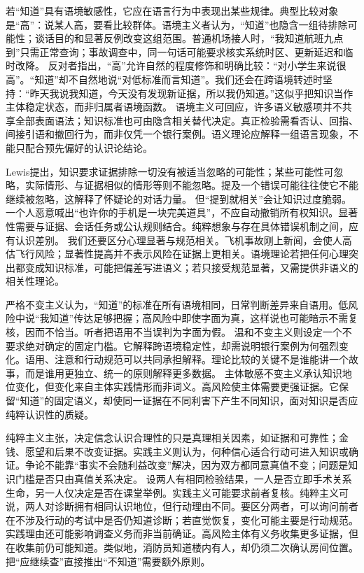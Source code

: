 若“知道”具有语境敏感性，它应在语言行为中表现出某些规律。典型比较对象是“高”：说某人高，要看比较群体。语境主义者认为，“知道”也隐含一组待排除可能性；谈话目的和显著反例改变这组范围\parencite{derose2009}。普通机场接人时，“我知道航班九点到”只需正常查询；事故调查中，同一句话可能要求核实系统时区、更新延迟和临时改降。 反对者指出，“高”允许自然的程度修饰和明确比较：“对小学生来说很高”。“知道”却不自然地说“对低标准而言知道”。我们还会在跨语境转述时坚持：“昨天我说我知道，今天没有发现新证据，所以我仍知道。”这似乎把知识当作主体稳定状态，而非归属者语境函数。 语境主义可回应，许多语义敏感项并不共享全部表面语法；知识标准也可由隐含相关替代决定。真正检验需看否认、回指、间接引语和撤回行为，而非仅凭一个银行案例。语义理论应解释一组语言现象，不能只配合预先偏好的认识论结论。

Lewis提出，知识要求证据排除一切没有被适当忽略的可能性；某些可能性可忽略，实际情形、与证据相似的情形等则不能忽略\parencite{lewis1996}。提及一个错误可能往往使它不能继续被忽略，这解释了怀疑论的对话力量。 但“提到就相关”会让知识过度脆弱。一个人恶意喊出“也许你的手机是一块完美道具”，不应自动撤销所有权知识。显著性需要与证据、会话任务或公认规则结合。纯粹想象与存在具体错误机制之间，应有认识差别。 我们还要区分心理显著与规范相关。飞机事故刚上新闻，会使人高估飞行风险；显著性提高并不表示风险在证据上更相关。语境理论若把任何心理突出都变成知识标准，可能把偏差写进语义；若只接受规范显著，又需提供非语义的相关性理论。

严格不变主义认为，“知道”的标准在所有语境相同，日常判断差异来自语用。低风险中说“我知道”传达足够把握；高风险中即使字面为真，这样说也可能暗示不需复核，因而不恰当。听者把语用不当误判为字面为假。 温和不变主义则设定一个不要求绝对确定的固定门槛。它解释跨语境稳定性，却需说明银行案例为何强烈变化。语用、注意和行动规范可以共同承担解释。理论比较的关键不是谁能讲一个故事，而是谁用更独立、统一的原则解释更多数据。 主体敏感不变主义承认知识地位变化，但变化来自主体实践情形而非词义\parencite{stanley2005}。高风险使主体需要更强证据。它保留“知道”的固定语义，却使同一证据在不同利害下产生不同知识，面对知识是否应纯粹认识性的质疑。

纯粹主义主张，决定信念认识合理性的只是真理相关因素，如证据和可靠性；金钱、愿望和后果不改变证据。实践主义则认为，何种信心适合行动可进入知识或确证。争论不能靠“事实不会随利益改变”解决，因为双方都同意真值不变；问题是知识门槛是否只由真值关系决定。 设两人有相同检验结果，一人是否立即手术关系生命，另一人仅决定是否在课堂举例。实践主义可能要求前者复核。纯粹主义可说，两人对诊断拥有相同认识地位，但行动理由不同。要区分两者，可以询问前者在不涉及行动的考试中是否仍知道诊断；若直觉恢复，变化可能主要是行动规范。 实践理由还可能影响调查义务而非当前确证。高风险主体有义务收集更多证据，但在收集前仍可能知道。类似地，消防员知道楼内有人，却仍须二次确认房间位置。把“应继续查”直接推出“不知道”需要额外原则。


